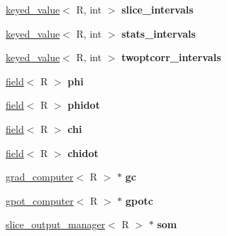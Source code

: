 \begin{DoxyCompactItemize}
\item 
\hypertarget{classmodel_abaa2d75f66beefce1e0a7ee6ffd8793b}{
\hyperlink{structkeyed__value}{keyed\_\-value}$<$ R, int $>$ {\bfseries slice\_\-intervals}}
\label{classmodel_abaa2d75f66beefce1e0a7ee6ffd8793b}

\item 
\hypertarget{classmodel_a20b78d7409e56144005ff30d26798e7c}{
\hyperlink{structkeyed__value}{keyed\_\-value}$<$ R, int $>$ {\bfseries stats\_\-intervals}}
\label{classmodel_a20b78d7409e56144005ff30d26798e7c}

\item 
\hypertarget{classmodel_a4bcea6b6c78361ff9ec2abd62ea9bcdf}{
\hyperlink{structkeyed__value}{keyed\_\-value}$<$ R, int $>$ {\bfseries twoptcorr\_\-intervals}}
\label{classmodel_a4bcea6b6c78361ff9ec2abd62ea9bcdf}

\item 
\hypertarget{classmodel_ae4eadf04cea985864f0fe3bc488aac5f}{
\hyperlink{classfield}{field}$<$ R $>$ {\bfseries phi}}
\label{classmodel_ae4eadf04cea985864f0fe3bc488aac5f}

\item 
\hypertarget{classmodel_a39a3d7f259f021693157b6b2d8a17285}{
\hyperlink{classfield}{field}$<$ R $>$ {\bfseries phidot}}
\label{classmodel_a39a3d7f259f021693157b6b2d8a17285}

\item 
\hypertarget{classmodel_aea7e2cf8648a963f20295d375bb3ad6b}{
\hyperlink{classfield}{field}$<$ R $>$ {\bfseries chi}}
\label{classmodel_aea7e2cf8648a963f20295d375bb3ad6b}

\item 
\hypertarget{classmodel_aeb232ddca67d5c55388e4e40f2a337c8}{
\hyperlink{classfield}{field}$<$ R $>$ {\bfseries chidot}}
\label{classmodel_aeb232ddca67d5c55388e4e40f2a337c8}

\item 
\hypertarget{classmodel_abbd490806cef7af3fb1c201190854451}{
\hyperlink{classgrad__computer}{grad\_\-computer}$<$ R $>$ $\ast$ {\bfseries gc}}
\label{classmodel_abbd490806cef7af3fb1c201190854451}

\item 
\hypertarget{classmodel_a0e84b2e244bbfaf6355a9dcfa558f860}{
\hyperlink{classgpot__computer}{gpot\_\-computer}$<$ R $>$ $\ast$ {\bfseries gpotc}}
\label{classmodel_a0e84b2e244bbfaf6355a9dcfa558f860}

\item 
\hypertarget{classmodel_ac0f228a8a23b4afaea409a0295efc73a}{
\hyperlink{classslice__output__manager}{slice\_\-output\_\-manager}$<$ R $>$ $\ast$ {\bfseries som}}
\label{classmodel_ac0f228a8a23b4afaea409a0295efc73a}


\end{DoxyCompactItemize}
